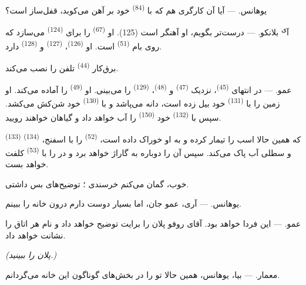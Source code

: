 \textsc{یوهانس}. --- آیا آن کارگری هم که با 
\textsuperscript{(84)} خود بر آهن می‌کوبد، قفل‌ساز است؟

آ\textsuperscript{ی} \textsc{بلانکو}. --- درست‌تر بگویم، او آهنگر است
(125). او  \textsuperscript{(67)} را برای
 \textsuperscript{(124)} می‌سازد که روی بام
 \textsuperscript{(51)} است. او 
\textsuperscript{(126)}،  \textsuperscript{(127)} و
 \textsuperscript{(128)} دارد.

برق‌کار   \textsuperscript{(44)} تلفن را نصب
می‌کند.

\VUsaut{3.0mm}

\textsc{عمو}. --- در انتهای  \textsuperscript{(45)}،
نزدیک  \textsuperscript{(47)} و 
\textsuperscript{(48)}،  \textsuperscript{(129)} را
می‌بینی. او  \textsuperscript{(49)} را آماده می‌کند. او
زمین را با  \textsuperscript{(131)} خود بیل زده است، دانه
می‌پاشد و با  \textsuperscript{(130)} خود شن‌کش می‌کشد.
سپس با  \textsuperscript{(132)} خود 
\textsuperscript{(150)} را آب خواهد داد و گیاهان خواهند رویید.

 \textsuperscript{(133)} که همین حالا اسب را تیمار کرده و
به او خوراک داده است،  \textsuperscript{(52)} را با
اسفنج،  \textsuperscript{(134)} و سطلی آب پاک
می‌کند. سپس آن را دوباره به گاراژ خواهد برد و در را با 
\textsuperscript{(53)} کلفت خواهد بست.

خوب، گمان می‌کنم خرسندی ؛ توضیح‌های بس داشتی.

\textsc{یوهانس}. --- آری، عمو جان، اما بسیار دوست دارم درون خانه را
ببینم.

\textsc{عمو}. --- این فردا خواهد بود. آقای روفو پلان را برایت توضیح
خواهد داد و نام هر اتاق را نشانت خواهد داد.

\VUsaut{3.0mm}
\VUsaut{2.4mm}

{\centering\textit{(پلان را ببینید.)}\par}
\VUsaut{2.4mm}

\textsc{معمار}. --- بیا، یوهانس، همین حالا تو را در بخش‌های گوناگون این
خانه می‌گردانم.

